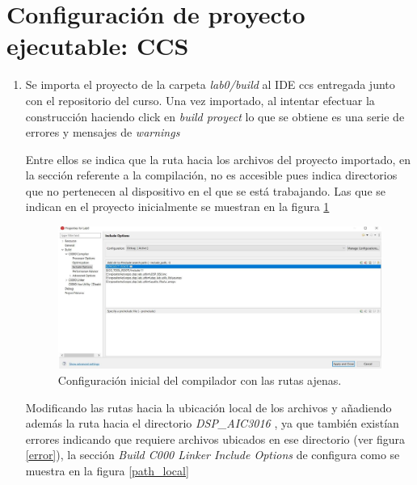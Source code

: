 \section{Configuración de proyecto ejecutable: CCS}

\begin{enumerate}
    \item  Se importa el proyecto de la carpeta \textit{lab0/build} al IDE ccs entregada junto con el repositorio del curso. Una vez importado, al intentar efectuar la construcción haciendo click en \textit{build proyect} lo que se obtiene es una serie de errores y mensajes de \textit{warnings}
    
    
    Entre ellos se indica que la ruta hacia los archivos del proyecto importado, en la sección referente a la compilación, no es accesible pues indica directorios que no pertenecen al dispositivo en el que se está trabajando. Las que se indican en el proyecto inicialmente se muestran en la figura \ref{path_profe}
    
    
    \begin{figure}[H]
        \centering
        \includegraphics[width = 0.9 \linewidth]{figures/pathProfe.png}
        \caption{Configuración inicial del compilador con las rutas ajenas.}
        \label{path_profe}
    \end{figure}
    
    
    Modificando las rutas hacia la ubicación local de los archivos y añadiendo además la ruta hacia el directorio \textit{DSP\_AIC3016} , ya que también existían errores indicando que requiere archivos ubicados en ese directorio  (ver figura \ref{error}), la  sección \textit{Build C000 Linker Include Options} de configura como se muestra en la figura \ref{path_local}
    
    
    

\end{enumerate}

